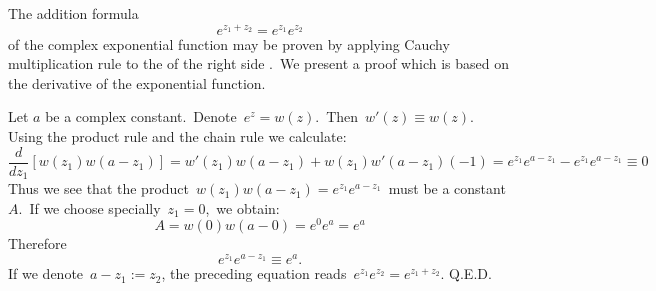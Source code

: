 \documentclass[12pt]{article}
\theoremstyle{definition}
\begin{document}
 

The addition formula 
$$e^{z_1+z_2} = e^{z_1}e^{z_2}$$
of the complex exponential function may be proven by applying Cauchy multiplication rule to the  of the right side .\, We present a proof which is based on the derivative of the exponential function.

Let $a$ be a complex constant.\, Denote\, $e^z = w(z)$.\, Then\, 
$w'(z) \equiv w(z)$.\, Using the product rule and the chain rule we calculate:
 $$\frac{d}{dz_1}[w(z_1)w(a-z_1)] = w'(z_1)w(a-z_1)+w(z_1)w'(a-z_1)(-1) = 
   e^{z_1}e^{a-z_1}-e^{z_1}e^{a-z_1} \equiv 0$$
Thus we see that the product\, $w(z_1)w(a-z_1) = e^{z_1}e^{a-z_1}$\, must be a constant $A$.\, If we choose specially\, $z_1 = 0$,\, we obtain:
   $$A = w(0)w(a-0) = e^0e^a = e^a$$
Therefore\, 
   $$e^{z_1}e^{a-z_1} \equiv e^a.$$
If we denote\, $a-z_1 := z_2$, the preceding equation reads\, $e^{z_1}e^{z_2} = e^{z_1+z_2}$. Q.E.D.




\end{document}
